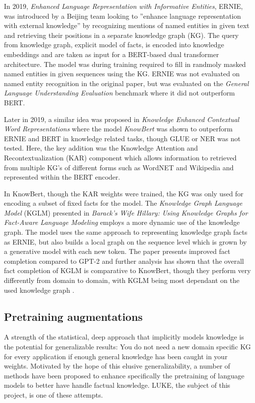 \documentclass[main.tex]{subfiles}
\begin{document}
In 2019, \emph{Enhanced Language Representation with Informative Entities}, ERNIE, was introduced by a Beijing team \cite{zhang2019ernie} looking to ''enhance language representation  with  external  knowledge'' \cite[1]{zhang2019ernie} by recognizing mentions of named entities in given text and retrieving their positions in a separate knowledge graph (KG).
The query from knowledge graph, explicit model of facts, is encoded into knowledge embeddings and are taken as input for a BERT-based dual transformer architecture.
The model was during training required to fill in randmoly masked named entities in given sequences using the KG.
ERNIE was not evaluated on named entity recognition in the original paper, but was evaluated on the \emph{General Language Understanding Evaluation} benchmark \cite{wang2018glue} where it did not outperform BERT.

Later in 2019, a similar idea was proposed in \emph{Knowledge Enhanced Contextual Word Representations} where the model \emph{KnowBert} \cite{peters2019knowbert} was shown to outperform ERNIE and BERT in knowledge related tasks, though GLUE or NER was not tested.
Here, the key addition was the Knowledge Attention and Recontextualization (KAR) component which allows information to retrieved from multiple KG's of different forms such as WordNET and Wikipedia and represented within the BERT encoder.

In KnowBert, though the KAR weights were trained, the KG was only used for encoding a subset of fixed facts for the model.
The \emph{Knowledge Graph Language Model} (KGLM) presented in \emph{Barack’s Wife Hillary: Using Knowledge Graphs for Fact-Aware Language Modeling} \cite{logan2019barack} employs a more dynamic use of the knowledge graph.
The model uses the same approach to representing knowledge graph facts as ERNIE, but also builds a local graph on the sequence level which is grown by a generative model with each new token.
The paper presents improved fact completion compared to GPT-2 and further analysis has shown that the overall fact completion of KGLM is comparative to KnowBert, though they perform very differently from domain to domain, with KGLM being most dependant on the used knowledge graph \cite{birk2020knowledge}.

\subsection{Pretraining augmentations}
A strength of the statistical, deep approach that implicitly models knowledge is the potential for generalizable results:
You do not need a new domain specific KG for every application if enough general knowledge has been caught in your weights.
Motivated by the hope of this elusive generalizability, a number of methods have been proposed to enhance specifically the pretraining of language models to better have handle factual knowledge.
LUKE, the subject of this project, is one of these attempts.
\end{document}
